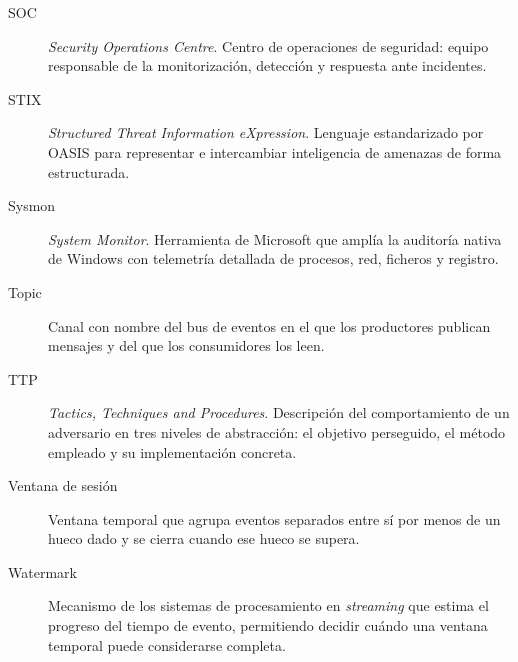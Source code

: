 \begin{description}
\item[SOC] \textit{Security Operations Centre}. Centro de operaciones de seguridad: equipo
responsable de la monitorización, detección y respuesta ante incidentes.

\item[STIX] \textit{Structured Threat Information eXpression}. Lenguaje estandarizado por
OASIS para representar e intercambiar inteligencia de amenazas de forma estructurada.

\item[Sysmon] \textit{System Monitor}. Herramienta de Microsoft que amplía la auditoría
nativa de Windows con telemetría detallada de procesos, red, ficheros y registro.

\item[Topic] Canal con nombre del bus de eventos en el que los productores publican mensajes y
del que los consumidores los leen.

\item[TTP] \textit{Tactics, Techniques and Procedures}. Descripción del comportamiento de un
adversario en tres niveles de abstracción: el objetivo perseguido, el método empleado y su
implementación concreta.

\item[Ventana de sesión] Ventana temporal que agrupa eventos separados entre sí por menos de un
hueco dado y se cierra cuando ese hueco se supera.

\item[Watermark] Mecanismo de los sistemas de procesamiento en \textit{streaming} que estima
el progreso del tiempo de evento, permitiendo decidir cuándo una ventana temporal puede
considerarse completa.

\end{description}
